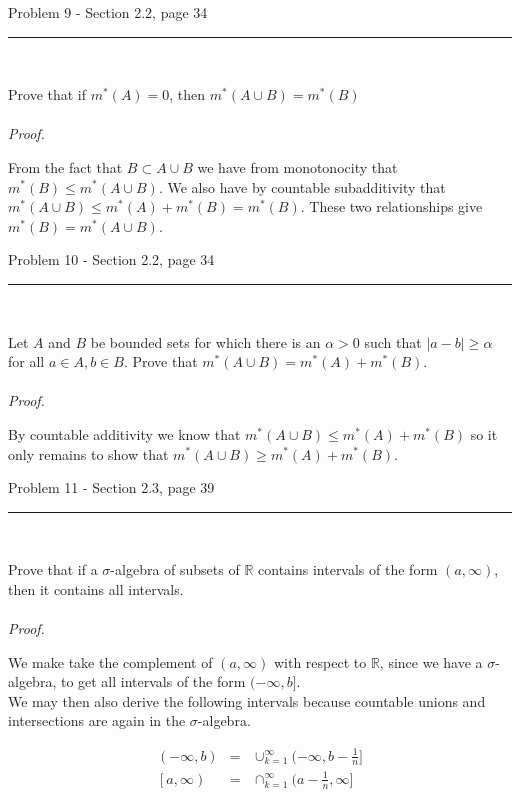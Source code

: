 \documentclass[11pt,reqno]{article}
\begin{document}
\begin{flushleft} 
Problem 9 - Section 2.2, page 34\\
\rule{500pt}{1pt}\\
\end{flushleft} 

Prove that if $m^*(A) = 0$, then $m^*(A \cup B) = m^*(B)$
\\\\ \emph{Proof.}

From the fact that $B \subset A \cup B$ we have from monotonocity that $m^*(B) \le m^*(A \cup B)$. We also have by countable subadditivity that $m^*(A \cup B) \le m^*(A) + m^*(B) = m^*(B)$. These two relationships give $m^*(B) = m^*(A \cup B)$.

\begin{flushleft} 
Problem 10 - Section 2.2, page 34\\
\rule{500pt}{1pt}\\
\end{flushleft} 

Let $A$ and $B$ be bounded sets for which there is an $\alpha > 0$ such that $|a - b| \ge \alpha$ for all $a \in A, b \in B$. Prove that $m^*(A \cup B) = m^*(A) + m ^*(B)$.
\\\\ \emph{Proof.}

By countable additivity we know that $m^*(A \cup B) \le m^*(A) + m^*(B)$ so it only remains to show that $m^*(A \cup B) \ge m^*(A) + m^*(B)$.

\begin{flushleft} 
Problem 11 - Section 2.3, page 39\\
\rule{500pt}{1pt}\\
\end{flushleft} 

Prove that if a $\sigma$-algebra of subsets of $\mathbb{R}$ contains intervals of the form $(a,\infty)$, then it contains all intervals.
\\\\ \emph{Proof.}

We make take the complement of $(a,\infty)$ with respect to $\mathbb{R}$, since we have a $\sigma$-algebra, to get all intervals of the form $(-\infty, b]$.\\
We may then also derive the following intervals because countable unions and intersections are again in the $\sigma$-algebra.

\begin{eqnarray*}
(-\infty, b) &=& \cup_{k = 1}^\infty (-\infty, b - \frac{1}{n}] \\
\left[a, \infty \right) &=& \cap_{k = 1}^\infty (a - \frac{1}{n}, \infty]
\end{eqnarray*}
\end{document}

